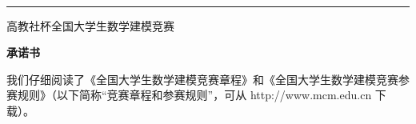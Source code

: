 
\providecommand{\pkb@submityear}{\the\year}
\providecommand{\pkb@tihao}{[在此填写题号]}
\providecommand{\pkb@baominghao}{[在此填写队号]}
\providecommand{\pkb@schoolname}{[在此填写学校全称]}
\providecommand{\pkb@membera}{[队员一姓名]}
\providecommand{\pkb@memberb}{[队员二姓名]}
\providecommand{\pkb@memberc}{[队员三姓名]}
\providecommand{\pkb@supervisor}{[指导教师姓名]}
\providecommand{\pkb@submitmonth}{[月]}
\providecommand{\pkb@submitday}{[日]}

\newcommand{\cumcmSubmitYear}[1]{\renewcommand{\pkb@submityear}{#1}}
\newcommand{\cumcmTihao}[1]{\renewcommand{\pkb@tihao}{#1}}
\newcommand{\cumcmBaominghao}[1]{\renewcommand{\pkb@baominghao}{#1}}
\newcommand{\cumcmSchoolname}[1]{\renewcommand{\pkb@schoolname}{#1}}
\newcommand{\cumcmMemberA}[1]{\renewcommand{\pkb@membera}{#1}}
\newcommand{\cumcmMemberB}[1]{\renewcommand{\pkb@memberb}{#1}}
\newcommand{\cumcmMemberC}[1]{\renewcommand{\pkb@memberc}{#1}}
\newcommand{\cumcmSupervisor}[1]{\renewcommand{\pkb@supervisor}{#1}}
\newcommand{\cumcmSubmitDate}[2]{\renewcommand{\pkb@submitmonth}{#1}\renewcommand{\pkb@submitday}{#2}}

\thispagestyle{empty}

\vspace*{0.1em}

\\[-0.45em]
\noindent\rule{\textwidth}{0.5pt}

\begin{center}
  {\heiti{} \pkb@submityear 高教社杯全国大学生数学建模竞赛}
\end{center}

\vspace{0.2em}

\begin{center}
  {\songti\bfseries{} 承\quad 诺\quad 书}
\end{center}

\vspace{0.8em}

\begingroup
\songti{}
我们仔细阅读了《全国大学生数学建模竞赛章程》和《全国大学生数学建模竞赛参赛规则》（以下简称“竞赛章程和参赛规则”，可从 http://www.mcm.edu.cn 下载）。

